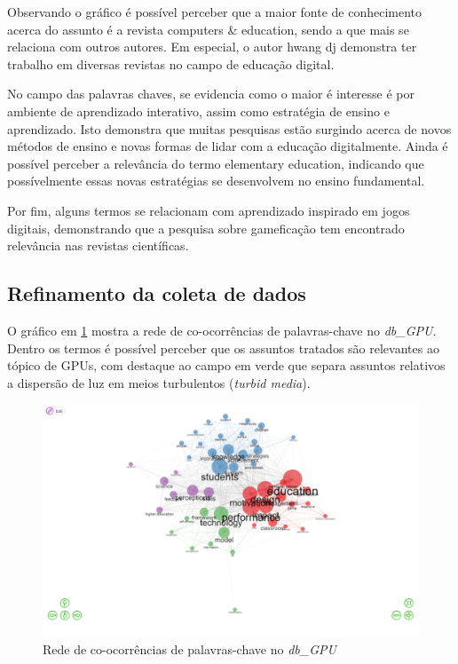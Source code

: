 Observando o gráfico é possível perceber que a maior fonte de conhecimento acerca do assunto é a revista computers & education, sendo a que mais se relaciona com outros autores. Em especial, o autor hwang dj demonstra ter trabalho em diversas revistas no campo de educação digital.

No campo das palavras chaves, se evidencia como o maior é interesse é por ambiente de aprendizado interativo, assim como estratégia de ensino e aprendizado. Isto demonstra que muitas pesquisas estão surgindo acerca de novos métodos de ensino e novas formas de lidar com a educação digitalmente. Ainda é possível perceber a relevância do termo elementary education, indicando que possívelmente essas novas estratégias se desenvolvem no ensino fundamental.

Por fim, alguns termos se relacionam com aprendizado inspirado em jogos digitais, demonstrando que a pesquisa sobre gameficação tem encontrado relevância nas revistas científicas.


\subsection{Refinamento da coleta de dados}

O gráfico em \ref{fig:gpu-co-occur} mostra a rede de co-ocorrências de palavras-chave no \textit{db\_GPU}. Dentro os termos é possível perceber que os assuntos tratados são relevantes ao tópico de GPUs, com destaque ao campo em verde que separa assuntos relativos a dispersão de luz em meios turbulentos (\textit{turbid media}).

\begin{figure}[ht]
    \includegraphics[width=12cm]{experiments/MarcusABR/PesquisaBibliometrica/Imagens/network.png}
    \caption{Rede de co-ocorrências de palavras-chave no \textit{db\_GPU}}
    \label{fig:gpu-co-occur}
\end{figure}

